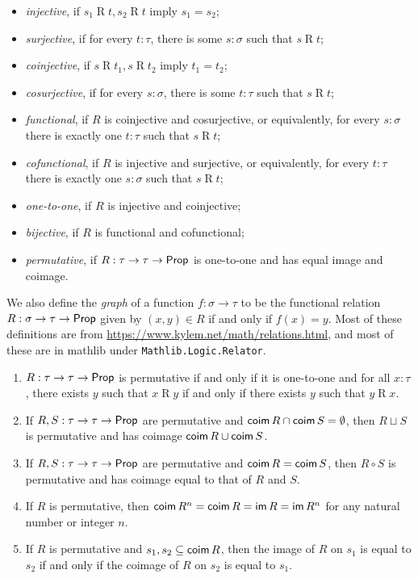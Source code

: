 \begin{definition}
\begin{itemize}
    \item \emph{injective}, if \( s_1 \mathrel{R} t, s_2 \mathrel{R} t \) imply \( s_1 = s_2 \);
    \item \emph{surjective}, if for every \( t : \tau \), there is some \( s : \sigma \) such that \( s \mathrel{R} t \);
    \item \emph{coinjective}, if \( s \mathrel{R} t_1, s \mathrel{R} t_2 \) imply \( t_1 = t_2 \);
    \item \emph{cosurjective}, if for every \( s : \sigma \), there is some \( t : \tau \) such that \( s \mathrel{R} t \);
    \item \emph{functional}, if \( R \) is coinjective and cosurjective, or equivalently, for every \( s : \sigma \) there is exactly one \( t : \tau \) such that \( s \mathrel{R} t \);
    \item \emph{cofunctional}, if \( R \) is injective and surjective, or equivalently, for every \( t : \tau \) there is exactly one \( s : \sigma \) such that \( s \mathrel{R} t \);
    \item \emph{one-to-one}, if \( R \) is injective and coinjective;
    \item \emph{bijective}, if \( R \) is functional and cofunctional;
    \item \emph{permutative}, if \( R : \tau \to \tau \to \mathsf{Prop} \) is one-to-one and has equal image and coimage.
  \end{itemize}
  We also define the \emph{graph} of a function \( f : \sigma \to \tau \) to be the functional relation \( R : \sigma \to \tau \to \mathsf{Prop} \) given by \( (x, y) \in R \) if and only if \( f(x) = y \).
  Most of these definitions are from \url{https://www.kylem.net/math/relations.html}, and most of these are in mathlib under \texttt{Mathlib.Logic.Relator}.
\end{definition}
\begin{proposition}\mbox\negthinspace
  \label{prop:relation_results}
  \begin{enumerate}
    \item \( R : \tau \to \tau \to \mathsf{Prop} \) is permutative if and only if it is one-to-one and for all \( x : \tau \), there exists \( y \) such that \( x \mathrel{R} y \) if and only if there exists \( y \) such that \( y \mathrel{R} x \).
    \item If \( R, S : \tau \to \tau \to \mathsf{Prop} \) are permutative and \( \operatorname{\mathsf{coim}} R \cap \operatorname{\mathsf{coim}} S = \emptyset \), then \( R \sqcup S \) is permutative and has coimage \( \operatorname{\mathsf{coim}} R \cup \operatorname{\mathsf{coim}} S \).
    \item If \( R, S : \tau \to \tau \to \mathsf{Prop} \) are permutative and \( \operatorname{\mathsf{coim}} R = \operatorname{\mathsf{coim}} S \), then \( R \circ S \) is permutative and has coimage equal to that of \( R \) and \( S \).
    \item If \( R \) is permutative, then \( \operatorname{\mathsf{coim}} R^n = \operatorname{\mathsf{coim}} R = \operatorname{\mathsf{im}} R = \operatorname{\mathsf{im}} R^n \) for any natural number or integer \( n \).
    \item If \( R \) is permutative and \( s_1, s_2 \subseteq \operatorname{\mathsf{coim}} R \), then the image of \( R \) on \( s_1 \) is equal to \( s_2 \) if and only if the coimage of \( R \) on \( s_2 \) is equal to \( s_1 \).
  \end{enumerate}
\end{proposition}
